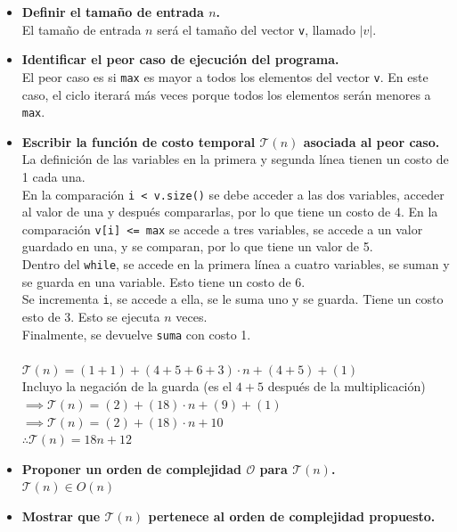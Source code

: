\documentclass[12 pt]{article}
\begin{document}
    \begin{itemize}
        \item \textbf{Definir el tamaño de entrada $n$.} \\
            El tamaño de entrada $n$ será el tamaño del vector \texttt{v}, llamado $|v|$.
        \item \textbf{Identificar el peor caso de ejecución del programa.} \\
            El peor caso es si \texttt{max} es mayor a todos los elementos del vector \texttt{v}. En este caso, el ciclo iterará más veces porque todos los elementos serán menores a \texttt{max}.
        \item \textbf{Escribir la función de costo temporal $\mathcal{T}(n)$ asociada al peor caso.} \\
            La definición de las variables en la primera y segunda línea tienen un costo de 1 cada una. \\
            En la comparación \texttt{i < v.size()} se debe acceder a las dos variables, acceder al valor de una y después compararlas, por lo que tiene un costo de 4. En la comparación \texttt{v[i] <= max} se accede a tres variables, se accede a un valor guardado en una, y se comparan, por lo que tiene un valor de 5. \\
            Dentro del \texttt{while}, se accede en la primera línea a cuatro variables, se suman y se guarda en una variable. Esto tiene un costo de 6. \\
            Se incrementa \texttt{i}, se accede a ella, se le suma uno y se guarda. Tiene un costo esto de 3. Esto se ejecuta $n$ veces. \\
            Finalmente, se devuelve \texttt{suma} con costo 1. \\
            \\
            \(\mathcal{T}(n) = (1+1)+(4+5+6+3)\cdot n+(4+5)+(1)\) \\
            Incluyo la negación de la guarda (es el $4+5$ después de la multiplicación) \\
            \(\implies \mathcal{T}(n) = (2)+(18)\cdot n+(9)+(1)\) \\
            \(\implies \mathcal{T}(n) = (2)+(18)\cdot n+10\) \\
            \(\therefore \mathcal{T}(n) = 18n+12\)
        \item \textbf{Proponer un orden de complejidad $\mathcal{O}$ para $\mathcal{T}(n)$.} \\
            \(\mathcal{T}(n) \in O(n)\)
        \item \textbf{Mostrar que $\mathcal{T}(n)$ pertenece al orden de complejidad propuesto.} \\

\end{itemize}
\end{document}
